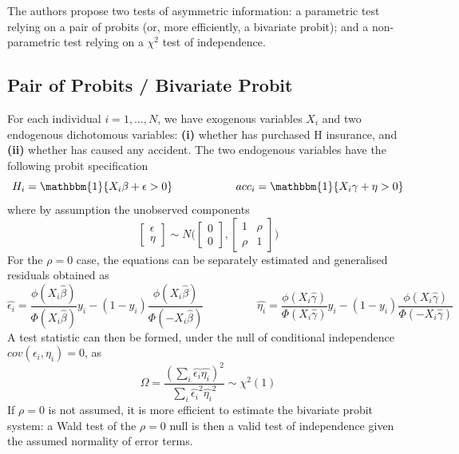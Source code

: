 \documentclass[11pt]{article}
\numberwithin{equation}{section}
\begin{document}
The authors propose two tests of asymmetric information: a parametric test relying on a pair of probits (or, more efficiently, a bivariate probit); and a non-parametric test relying on a $\chi^2$ test of independence.

\subsection{Pair of Probits / Bivariate Probit}

For each individual $i = 1,\dots, N$, we have exogenous variables $X_i$ and two endogenous dichotomous variables: \textbf{(i)} whether has purchased H insurance, and \textbf{(ii)} whether has caused any accident. The two endogenous variables have the following probit specification
\begin{equation}
H_i = \mathbbm{1} \{X_i \beta + \epsilon > 0\} \hspace{2cm} acc_i = \mathbbm{1} \{X_i \gamma + \eta > 0\}
\end{equation}
where by assumption the unobserved components
\[
\begin{bmatrix}
\epsilon \\
\eta
\end{bmatrix}
\sim N \bigg(
\begin{bmatrix}
0 \\ 0
\end{bmatrix}
,
\begin{bmatrix}
1 & \rho \\
\rho & 1
\end{bmatrix}
\bigg)\]
For the $\rho = 0$ case, the equations can be separately estimated and generalised residuals obtained as
\begin{equation}
	\hat{\epsilon_i} = \frac{\phi(X_i \hat{\beta})}{\Phi (X_i \hat{\beta})}y_i - (1 - y_i) \frac{\phi(X_i\hat{\beta})}{\Phi(-X_i \hat{\beta})} \hspace{2cm}
	\hat{\eta_i} = \frac{\phi(X_i \hat{\gamma})}{\Phi (X_i \hat{\gamma})}y_i - (1 - y_i) \frac{\phi(X_i\hat{\gamma})}{\Phi(-X_i \hat{\gamma})}
\end{equation}
A test statistic can then be formed, under the null of conditional independence $cov(\epsilon_i, \eta_i) = 0$, as
\begin{equation}
	\Omega = \frac{(\sum_i \hat{\epsilon_i}\hat{\eta_i})^2}{\sum_i \hat{\epsilon_i}^2\hat{\eta_i}^2} \sim \chi^2(1)
\end{equation}
If $\rho = 0$ is not assumed, it is more efficient to estimate the bivariate probit system: a Wald test of the $\rho = 0$ null is then a valid test of independence given the assumed normality of error terms.
\end{document}
